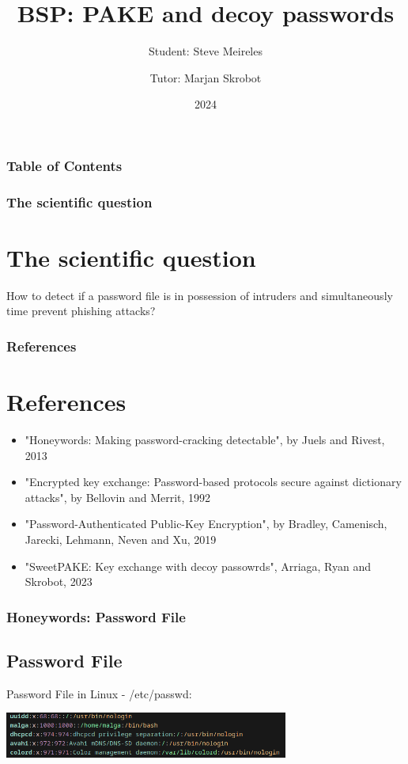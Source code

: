 \documentclass[9pt]{beamer}
\title[PAKE and Honeywords]{BSP: PAKE and decoy passwords}
\author[Steve Meireles]{Student: Steve Meireles \and Tutor: Marjan Skrobot}
\date{2024}
\begin{document}
\frame{\titlepage}

\begin{frame}
\frametitle{Table of Contents}
\tableofcontents
\end{frame}

\begin{frame}
\frametitle{The scientific question}
\section{The scientific question}
How to detect if a password file is in possession of intruders and simultaneously
time prevent phishing attacks?
\end{frame}

\begin{frame}
\frametitle{References}
\section{References}
\begin{itemize}
	\item "Honeywords: Making password-cracking detectable", by Juels and Rivest, 2013
	\item "Encrypted key exchange: Password-based protocols secure against
		dictionary attacks", by Bellovin and Merrit, 1992
	\item "Password-Authenticated Public-Key Encryption", by Bradley,
		Camenisch, Jarecki, Lehmann, Neven and Xu, 2019
	\item "SweetPAKE: Key exchange with decoy passowrds", Arriaga, Ryan and Skrobot, 2023
\end{itemize}
\end{frame}

\begin{frame}
\frametitle{Honeywords: Password File}
\subsection{Password File}
Password File in Linux - /etc/passwd:
   \begin{mdframed}
    \centering
	\includegraphics[width=0.7\textwidth]{images/pwd_file.png}
  \end{mdframed}
\end{frame}
\end{document}
